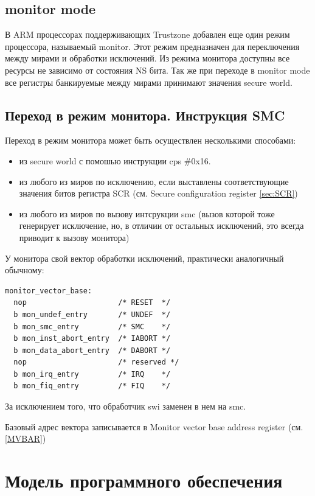 \documentclass[11pt]{article}
\begin{document}
\subsection{monitor mode}
В ARM процессорах поддерживающих Trustzone добавлен еще один режим процессора,
называемый monitor. Этот режим предназначен для переключения между мирами
и обработки исключений. Из режима монитора доступны все ресурсы не зависимо от 
состояния NS бита. Так же при переходе в monitor mode все регистры банкируемые
между мирами принимают значения secure world.

\subsection{Переход в режим монитора. Инструкция SMC}
Переход в режим монитора может быть осуществлен несколькими способами:

\begin{itemize}
\item из secure world с помошью инструкции cps \#0x16. 
\item из любого из миров по исключению, если выставлены соответствующие значения 
битов регистра SCR (см. Secure configuration register \ref{sec:SCR})
\item из любого из миров по вызову интсрукции smc (вызов которой тоже генерирует 
исключение, но, в отличии от остальных исключений, это всегда приводит к вызову 
монитора)
\end{itemize}

У монитора свой вектор обработки исключений, практически аналогичный обычному:
\begin{verbatim}
monitor_vector_base:
  nop                     /* RESET  */
  b mon_undef_entry       /* UNDEF  */
  b mon_smc_entry         /* SMC    */ 
  b mon_inst_abort_entry  /* IABORT */
  b mon_data_abort_entry  /* DABORT */
  nop                     /* reserved */
  b mon_irq_entry         /* IRQ    */
  b mon_fiq_entry         /* FIQ    */

\end{verbatim}
За исключением того, что обработчик swi заменен в нем на smc. 

Базовый адрес вектора записывается в Monitor vector base address register (см. 
\ref{MVBAR})


\section{Модель программного обеспечения}
\end{document}
